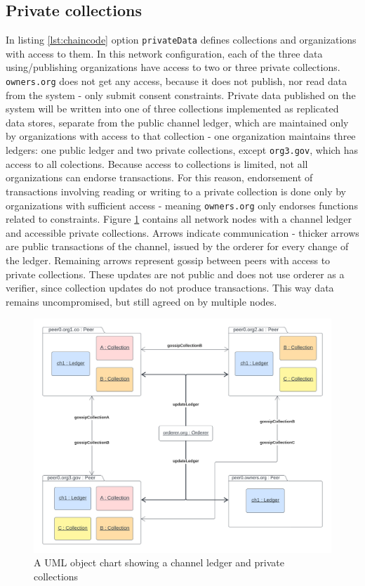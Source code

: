 \documentclass[12pt]{article}
\begin{document}
    \subsection{Private collections}
    In listing \ref{lst:chaincode} option \lstinline{privateData} defines collections and organizations with access to them. In this network configuration, each of the three data using/publishing organizations have access to two or three private collections. \lstinline{owners.org} does not get any access, because it does not publish, nor read data from the system - only submit consent constraints. Private data published on the system will be written into one of three collections implemented as replicated data stores, separate from the public channel ledger, which are maintained only by organizations with access to that collection - one organization maintains three ledgers: one public ledger and two private collections, except \lstinline{org3.gov}, which has access to all colections. Because access to collections is limited, not all organizations can endorse transactions. For this reason, endorsement of transactions involving reading or writing to a private collection is done only by organizations with sufficient access - meaning \lstinline{owners.org} only endorses functions related to constraints. Figure \ref{fig:collections} contains all network nodes with a channel ledger and accessible private collections. Arrows indicate communication - thicker arrows are public transactions of the channel, issued by the orderer for every change of the ledger. Remaining arrows represent gossip between peers with access to private collections. These updates are not public and does not use orderer as a verifier, since collection updates do not produce transactions. This way data remains uncompromised, but still agreed on by multiple nodes.
    
    
    \begin{figure}[H]
        \includegraphics[width=\textwidth]{collections.png}
        \caption{A UML object chart showing a channel ledger and private collections}
        \label{fig:collections}
    \end{figure}
\end{document}

